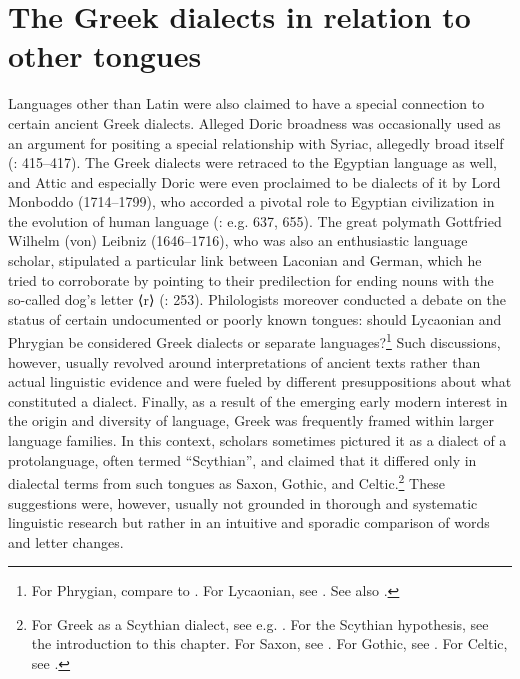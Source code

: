 \section{The Greek dialects in relation to other tongues}\label{sec:5.7}

Languages other than Latin were also claimed to have a special connection to certain ancient Greek dialects. Alleged Doric broadness was occasionally used as an argument for positing a special relationship with Syriac, allegedly broad itself (\citealt{Saumaise1643a}: 415–417). The Greek dialects were retraced to the Egyptian language as well, and Attic and especially Doric were even proclaimed to be dialects of it by Lord Monboddo (1714–1799), who accorded a pivotal role to Egyptian civilization in the evolution of human language (\citealt{Monboddo1774}: e.g. 637, 655). The great polymath Gottfried Wilhelm (von) Leibniz (1646–1716), who was also an enthusiastic language scholar, stipulated a particular link between Laconian and German, which he tried to corroborate by pointing to their predilection for ending nouns with the so-called dog’s letter ⟨r⟩ (\citealt{Leibniz1991}: 253). Philologists moreover conducted a debate on the status of certain undocumented or poorly known tongues: should Lycaonian and Phrygian be considered Greek dialects or separate languages?\footnote{For Phrygian, compare \citet[465]{Rijcke1684} to \citet[16]{Jablonski1714}. For Lycaonian, see \citet[2]{Jablonski1714}. See also \citet[]{VanRooyFcd}.} Such discussions, however, usually revolved around interpretations of ancient texts rather than actual linguistic evidence and were fueled by different presuppositions about what constituted a dialect. Finally, as a result of the emerging early modern interest in the origin and diversity of language, Greek was frequently framed within larger language families. In this context, scholars sometimes pictured it as a dialect of a protolanguage, often termed “Scythian”, and claimed that it differed only in dialectal terms from such tongues as Saxon, Gothic, and Celtic.\footnote{For Greek as a Scythian dialect, see e.g. \citet[xxxiv]{Court1778}. For the Scythian hypothesis, see the introduction to this chapter. For Saxon, see \citet[139; 190]{Casaubon1650}. For Gothic, see \citet[*.3\textsc{\textsuperscript{v}}]{Junius1665}. For Celtic, see \citet[\textsc{i}.44]{Martin1727}.} These suggestions were, however, usually not grounded in thorough and systematic linguistic research but rather in an intuitive and sporadic comparison of words and letter changes.

